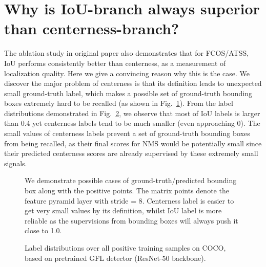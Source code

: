 \documentclass{article}
\begin{document}
\section{Why is IoU-branch always superior than centerness-branch?}
The ablation study in original paper also demonstrates that for FCOS/ATSS, IoU performs consistently better than centerness, as a measurement of localization quality. Here we give a convincing reason why this is the case. We discover the major problem of centerness is that its definition leads to unexpected small ground-truth label, which makes a possible set of ground-truth bounding boxes extremely hard to be recalled (as shown in Fig.~\ref{fig_centerness_vs_iou_cropped}). From the label distributions demonstrated in Fig.~\ref{fig_distribution_atss_centerness_iou_label}, we observe that most of IoU labels is larger than 0.4 yet centerness labels tend to be much smaller (even approaching 0). The small values of centerness labels prevent a set of ground-truth bounding boxes from being recalled, as their final scores for NMS would be potentially small since their predicted centerness scores are already supervised by these extremely small signals.
\begin{figure}[h]
	\begin{center}
		\setlength{\fboxrule}{0pt}
	\end{center}	
	\vspace{-12pt}
	\caption{We demonstrate possible cases of ground-truth/predicted bounding box along with the positive points. The matrix points denote the feature pyramid layer with stride = 8. Centerness label is easier to get very small values by its definition, whilst IoU label is more reliable as the supervisions from bounding boxes will always push it close to 1.0.}
	\label{fig_centerness_vs_iou_cropped}
	\vspace{-10pt}
\end{figure}

\begin{figure}[h]
	\begin{center}
		\setlength{\fboxrule}{0pt}
	\end{center}	
	\vspace{-12pt}
	\caption{Label distributions over all positive training samples on COCO, based on pretrained GFL detector (ResNet-50 backbone).}
	\label{fig_distribution_atss_centerness_iou_label}
	\vspace{-10pt}
\end{figure}
\end{document}
